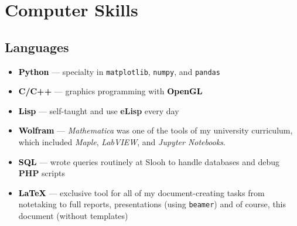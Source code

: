 \message{ !name(symonds_resume.tex)}\documentclass[10pt, a4paper]{article}
\newcommand{\point}[1]{\textcolor{black}{\textbf{#1}}}
\newcommand\pitem[1]{\item{\point{#1} ---}}
\newenvironment{brag}{
\renewcommand{\labelitemi}{\color{black}$\diamond$}
\vspace{-0.5em}
\begin{itemize}\color{fade}
\setlength\itemsep{0.2em}
}{\end{itemize}}
\begin{document}
\section{Computer Skills}
\vspace{-1.7em}
\begin{multicols}{2}
\subsection{Languages}
\begin{brag}
\pitem{Python}
specialty in \texttt{matplotlib}, \texttt{numpy}, and \texttt{pandas}
\pitem{C/C++}
graphics programming with \point{OpenGL}
\pitem{Lisp}
self-taught and use \textbf{eLisp} every day
\pitem{Wolfram}
\textit{Mathematica} was one of the tools of my university curriculum, which included \textit{Maple}, \textit{LabVIEW}, and \textit{Jupyter Notebooks}.
\pitem{SQL}
wrote queries routinely at Slooh to handle databases and debug \textbf{PHP} scripts

\pitem{\LaTeX}
exclusive tool for all of my document-creating tasks from notetaking to full reports, presentations (using \texttt{beamer}) and of course, this document 
\newline(without templates)
\end{brag}
\columnbreak

\end{multicols}
\end{document}
